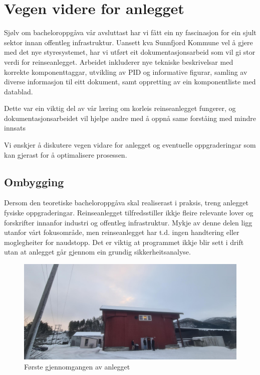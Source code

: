\section{Vegen videre for anlegget}
\thispagestyle{fancy}

Sjølv om bacheloroppgåva vår avsluttast har vi fått ein ny fascinasjon for ein sjult sektor innan offentleg infrastruktur. \newline
Uansett kva \gls{Sunnfjord Kommune}  vel å gjere med det nye styresystemet, har vi utført eit dokumentasjonsarbeid som vil gi stor verdi for reinseanlegget.
Arbeidet inkluderer nye tekniske beskrivelsar med korrekte komponenttaggar, 
utvikling av \gls{PID} og informative figurar, 
samling av diverse informasjon til eitt dokument, 
samt oppretting av ein komponentliste med datablad.

Dette var ein viktig del av vår læring om korleis reinseanlegget fungerer, 
og dokumentasjonsarbeidet vil hjelpe andre med å oppnå same forståing med mindre innsats

Vi ønskjer å diskutere vegen vidare for anlegget og eventuelle oppgraderingar som kan gjerast for å optimalisere prosessen.

\subsection{Ombygging}

Dersom den teoretiske bacheloroppgåva skal realiserast i praksis, treng anlegget fysiske oppgraderingar.
Reinseanlegget tilfredsstiller ikkje fleire relevante lover og forskrifter innanfor industri og offentleg infrastruktur.
Mykje av denne delen ligg utanfor vårt fokusområde, men reinseanlegget har t.d. ingen handtering eller moglegheiter for naudstopp.
Det er viktig at programmet ikkje blir sett i drift utan at anlegget går gjennom ein grundig sikkerheitsanalyse.

\begin{figure}[htbp]
    \centering
    \includegraphics[width=1\textwidth]{Bilder/SandeGjennomgang.jpg}
    \caption{Første gjennomgangen av anlegget}\label{fig:Bilete Gjennomgang}
\end{figure}

